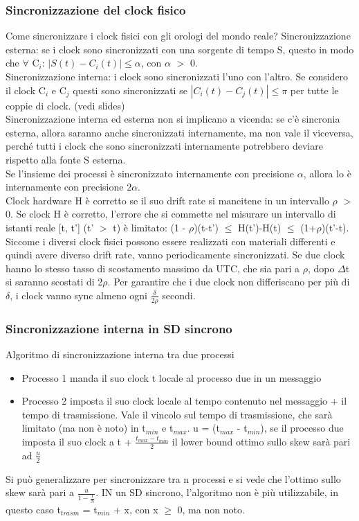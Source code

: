 \documentclass[16px]{article}
\begin{document}
\subsubsection{Sincronizzazione del clock fisico}
Come sincronizzare i clock fisici con gli orologi del mondo reale? Sincronizzazione esterna: se i clock sono sincronizzati con una sorgente di tempo S, questo in modo che $\forall$ C$_i$: $|S(t) - C_i(t)| \leq \alpha$, con $\alpha$ $>$ 0.\\ Sincronizzazione interna: i clock sono sincronizzati l'uno con l'altro. Se considero il clock C$_i$ e C$_j$ questi sono sincronizzati se $|C_i(t) - C_j(t)| \leq \pi$ per tutte le coppie di clock. (vedi slides)\\ Sincronizzazione interna ed esterna non si implicano a vicenda: se c'è sincronia esterna, allora saranno anche sincronizzati internamente, ma non vale il viceversa, perché tutti i clock che sono sincronizzati internamente potrebbero deviare rispetto alla fonte S esterna.\\ Se l'insieme dei processi è sincronizzato internamente con precisione $\alpha$, allora lo è internamente con precisione 2$\alpha$.\\ Clock hardware H è corretto se il suo drift rate si maneitene in un intervallo $\rho$ $>$ 0. Se clock H è corretto, l'errore che si commette nel misurare un intervallo di istanti reale [t, t'] (t' $>$ t) è limitato: (1 - $\rho$)(t-t') $\leq$ H(t')-H(t) $\leq$ (1+$\rho$)(t'-t).\\ Siccome i diversi clock fisici possono essere realizzati con materiali differenti e quindi avere diverso drift rate, vanno periodicamente sincronizzati. Se due clock hanno lo stesso tasso di scostamento massimo da UTC, che sia pari a $\rho$, dopo $\Delta$t si saranno scostati di 2$\rho$. Per garantire che i due clock non differiscano per più di $\delta$, i clock vanno sync almeno ogni $\frac{\delta}{2\rho}$ secondi.
\subsubsection{Sincronizzazione interna in SD sincrono}
Algoritmo di sincronizzazione interna tra due processi
\begin{itemize}
\item Processo 1 manda il suo clock t locale al processo due in un messaggio
\item Processo 2 imposta il suo clock locale al tempo contenuto nel messaggio + il tempo di trasmissione. Vale il vincolo sul tempo di trasmissione, che sarà limitato (ma non è noto) in t$_{min}$ e t$_{max}$. u = (t$_{max}$ - t$_{min}$), se il processo due imposta il suo clock a t + $\frac{t_{max} - t_{min}}{2}$ il lower bound ottimo sullo skew sarà pari ad $\frac{u}{2}$
\end{itemize}
Si può generalizzare per sincronizzare tra n processi e si vede che l'ottimo sullo skew sarà pari a $\frac{u}{1 - \frac{1}{N}}$. IN un SD sincrono, l'algoritmo non è più utilizzabile, in questo caso t$_{trasm}$ = t$_{min}$ + x, con x $\geq$ 0, ma non noto.
\end{document}
